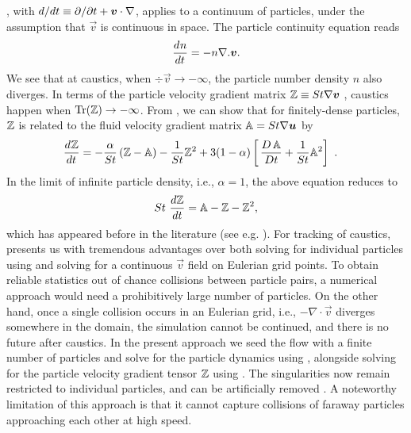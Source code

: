 \documentclass[../Rajarshi-thesis-draft.tex]{subfiles}
\begin{document}
, with $d/dt \equiv \partial/\partial t + \boldsymbol{v}\cdot \nabla$, applies to a continuum of particles, under the assumption that $\vec{v}$ is continuous in space.
The particle continuity equation reads
    \begin{align}
    \begin{split}
        \frac{d^{} n}{d t^{}} = - n \nabla . {\boldsymbol{v}}.
    \end{split}
    \end{align}
   We see that at caustics, when $\div{\vec{v}} \to -\infty$, the particle number density $n$ also diverges. In terms of the particle velocity gradient matrix $\mathbb{Z}  \equiv St\nabla\boldsymbol{v}$ \cite{falkovich2002,meibohm2021}, caustics happen when $\operatorname{Tr}(\mathbb{Z}) \to -\infty$. From , we can show that for finitely-dense particles, $\mathbb{Z}$ is related to the fluid velocity gradient matrix $\mathbb{A} = St\nabla\boldsymbol{u}$ by
    \begin{align}
    \label{int-Zeom}
    \begin{split}
      \frac{d^{} \mathbb{Z}}{d t^{}}    &= - \frac{\alpha}{St}\left( \mathbb{Z} -   \mathbb{A} \right)- \frac{1}{St}\mathbb{Z}^2+  3(1-\alpha)\left[ \,\frac{ D\, \mathbb{A}}{Dt}+ \frac{1}{St}\mathbb{A}^2  \right] \ .
    \end{split}
    \end{align}
   In the limit of infinite particle density, i.e., $\alpha=1$, the above equation reduces to
   \begin{equation}
   St~ \frac{d\mathbb{Z}}{dt} = \mathbb{A} - \mathbb{Z} - \mathbb{Z}^2,
   \label{int-theirs}
   \end{equation}
   which has appeared before in the literature (see e.g. \cite{falkovich2002,wilkinson2006,meibohm2023}). For tracking of caustics,  presents us with tremendous advantages over both solving for individual particles using  and solving for a continuous $\vec v$ field on Eulerian grid points. To obtain reliable statistics out of chance collisions between particle pairs, a numerical approach would need a prohibitively large number of particles. On the other hand, once a single collision occurs in an Eulerian grid, i.e.,  $-\nabla \cdot \vec v$ diverges somewhere in the domain, the simulation cannot be continued, and there is no future after caustics. In the present approach we seed the flow with a finite number of particles and solve for the particle dynamics using , alongside solving for the particle velocity gradient tensor $\mathbb{Z}$ using . The singularities now remain restricted to individual particles, and can be artificially removed \cite{falkovich2007}. A noteworthy limitation of this approach is that it cannot capture collisions of faraway particles approaching each other at high speed.
\end{document}
